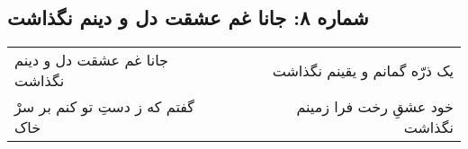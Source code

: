 \begin{center}
\section*{شماره ۸: جانا غم عشقت دل و دینم نگذاشت}
\label{sec:008}
\begin{longtable}{l p{0.5cm} r}
جانا غم عشقت دل و دینم نگذاشت
&&
یک ذرّه گمانم و یقینم نگذاشت
\\
گفتم که ز دستِ تو کنم بر سرْ خاک
&&
خود عشقِ رخت فرا زمینم نگذاشت
\\
\end{longtable}
\end{center}

